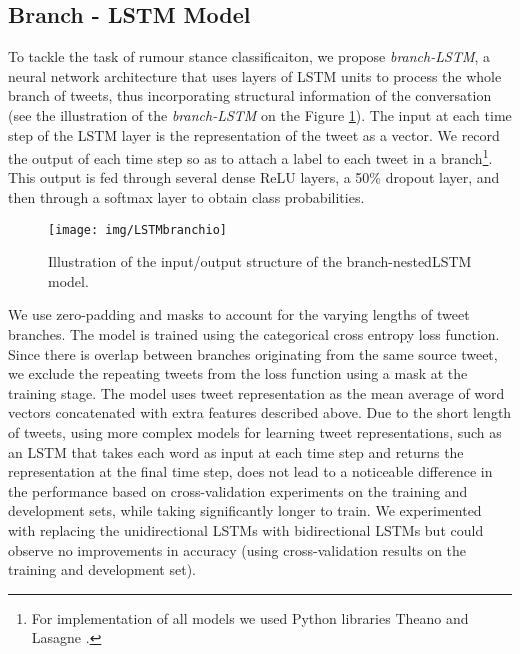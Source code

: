 \documentclass[11pt,a4paper]{article}
\begin{document}
\subsection{Branch - LSTM Model}
 To tackle the task of rumour stance classificaiton, we propose \textit{branch-LSTM}, a neural network architecture that uses layers of LSTM units \cite{hochreiter1997long} to process the whole branch of tweets, thus incorporating structural information of the conversation (see the illustration of the \textit{branch-LSTM} on the Figure \ref{fig:hlstm}). The input at each time step   of the LSTM layer is the representation of the tweet as a vector.  We record the output of each time step so as to attach a label to each tweet in a branch\footnote{For implementation of all models we used Python libraries Theano \cite{bastien2012theano} and Lasagne \cite{lasagne}.}. This output is fed through several dense ReLU layers, a 50\% dropout layer,  and then through a softmax layer to obtain class probabilities. 
 \begin{figure}
	\centering
	\texttt{[image: img/LSTMbranchio]}
	\vspace{-0.9cm}
	\caption{Illustration of the input/output structure of the branch-nestedLSTM model.} \vspace{-0.2cm}
	\label{fig:hlstm}
\end{figure}
We use zero-padding and masks to account for the varying lengths of tweet branches. The model is trained using the categorical cross entropy loss function.
Since there is overlap between branches originating from the same source tweet, we exclude the repeating tweets from the loss function using a mask at the training stage.
The model uses tweet representation as the mean average of word vectors concatenated with extra features described above. Due to the short length of tweets, using more complex models for learning tweet representations, such as an LSTM that takes each word as input at each time step and returns the representation at the final time step, does not lead to a noticeable difference in the performance based on cross-validation experiments on the training and development sets, while taking significantly longer to train.
We experimented with replacing the unidirectional LSTMs with bidirectional LSTMs but could observe no improvements in accuracy (using cross-validation results on the training and development set). 
\end{document}
